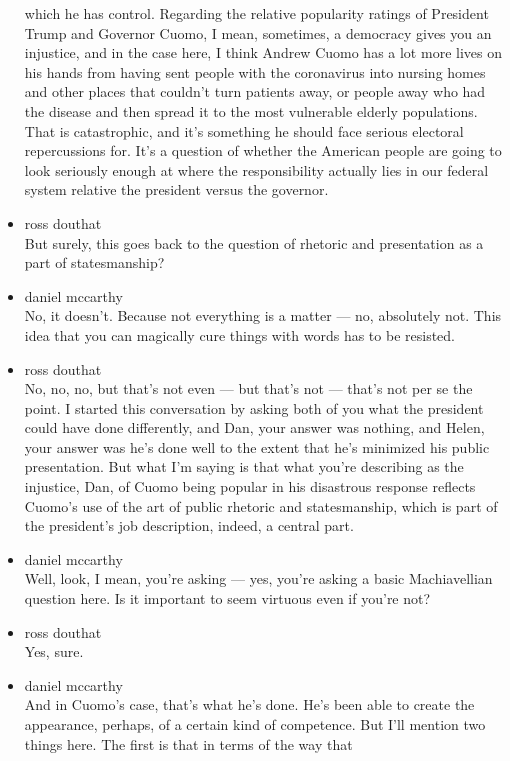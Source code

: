 \begin{itemize}
  which he has control. Regarding the relative popularity ratings of
  President Trump and Governor Cuomo, I mean, sometimes, a democracy
  gives you an injustice, and in the case here, I think Andrew Cuomo has
  a lot more lives on his hands from having sent people with the
  coronavirus into nursing homes and other places that couldn't turn
  patients away, or people away who had the disease and then spread it
  to the most vulnerable elderly populations. That is catastrophic, and
  it's something he should face serious electoral repercussions for.
  It's a question of whether the American people are going to look
  seriously enough at where the responsibility actually lies in our
  federal system relative the president versus the governor.
\item
  ross douthat\\
  But surely, this goes back to the question of rhetoric and
  presentation as a part of statesmanship?
\item
  daniel mccarthy\\
  No, it doesn't. Because not everything is a matter --- no, absolutely
  not. This idea that you can magically cure things with words has to be
  resisted.
\item
  ross douthat\\
  No, no, no, but that's not even --- but that's not --- that's not per
  se the point. I started this conversation by asking both of you what
  the president could have done differently, and Dan, your answer was
  nothing, and Helen, your answer was he's done well to the extent that
  he's minimized his public presentation. But what I'm saying is that
  what you're describing as the injustice, Dan, of Cuomo being popular
  in his disastrous response reflects Cuomo's use of the art of public
  rhetoric and statesmanship, which is part of the president's job
  description, indeed, a central part.
\item
  daniel mccarthy\\
  Well, look, I mean, you're asking --- yes, you're asking a basic
  Machiavellian question here. Is it important to seem virtuous even if
  you're not?
\item
  ross douthat\\
  Yes, sure.
\item
  daniel mccarthy\\
  And in Cuomo's case, that's what he's done. He's been able to create
  the appearance, perhaps, of a certain kind of competence. But I'll
  mention two things here. The first is that in terms of the way that

\end{itemize}
